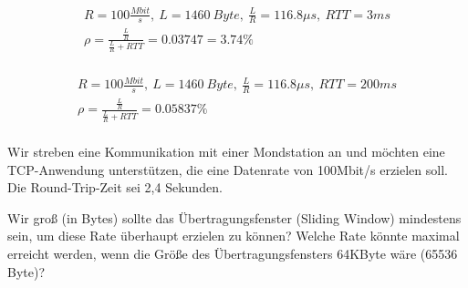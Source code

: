 

\begin{gather*}
    R = 100 \frac{Mbit}{s},\ L = 1460\ Byte, \ \frac{L}{R}=116.8\mu s, \ RTT = 3ms\\
    \rho = \frac {\frac{L}{R}} {\frac{L}{R} + RTT} = 0.03747 = 3.74\%\\
\end{gather*}


\begin{gather*}
    R = 100 \frac{Mbit}{s},\ L = 1460\ Byte, \ \frac{L}{R}=116.8\mu s, \ RTT = 200ms\\
    \rho = \frac {\frac{L}{R}} {\frac{L}{R} + RTT} = 0.05837\%\\
\end{gather*}

Wir streben eine Kommunikation mit einer Mondstation an und möchten eine TCP-Anwendung unterstützen, die eine Datenrate von 100Mbit/s erzielen soll.
Die Round-Trip-Zeit sei 2,4 Sekunden.

Wir groß (in Bytes) sollte das Übertragungsfenster (Sliding Window) mindestens sein, um diese Rate überhaupt erzielen zu können?
Welche Rate könnte maximal erreicht werden, wenn die Größe des Übertragungsfensters 64KByte wäre (65536 Byte)?